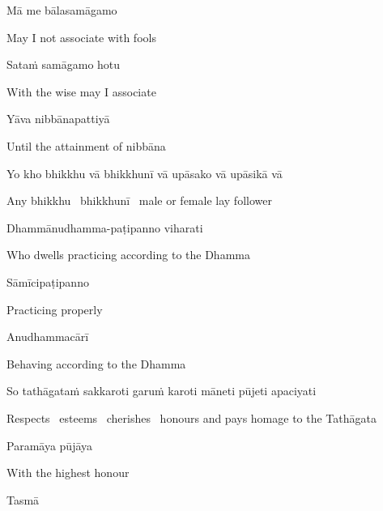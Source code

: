 Mā me bālasamāgamo

\begin{cprenglish}
  May I not associate with fools
\end{cprenglish}

Sataṁ samāgamo hotu

\begin{cprenglish}
  With the wise may I associate
\end{cprenglish}

Yāva nibbānapattiyā

\begin{cprenglish}
  Until the attainment of nibbāna
\end{cprenglish}


Yo kho bhikkhu vā bhikkhunī vā upāsako vā upāsikā vā

\begin{cprenglish}
  Any bhikkhu \breathmark\ bhikkhunī \breathmark\ male or female lay follower
\end{cprenglish}

Dhammānudhamma-paṭipanno viharati

\begin{cprenglish}
  Who dwells practicing according to the Dhamma
\end{cprenglish}

Sāmīcipaṭipanno

\begin{cprenglish}
  Practicing properly
\end{cprenglish}

Anudhammacārī

\begin{cprenglish}
  Behaving according to the Dhamma
\end{cprenglish}

So tathāgataṁ sakkaroti garuṁ karoti māneti pūjeti apaciyati

\begin{cprenglish}
  Respects \breathmark\ esteems \breathmark\ cherishes \breathmark\ honours and pays homage to the Tathāgata
\end{cprenglish}

Paramāya pūjāya

\begin{cprenglish}
  With the highest honour
\end{cprenglish}

\suttaRef{[DN 16]}

Tasmā

